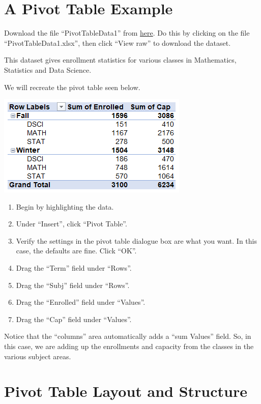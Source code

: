 \documentclass[
]{book}
\providecommand{\tightlist}{%
  \setlength{\itemsep}{0pt}\setlength{\parskip}{0pt}}
\begin{document}
\hypertarget{a-pivot-table-example}{%
\section{A Pivot Table Example}\label{a-pivot-table-example}}

Download the file ``PivotTableData1'' from \href{https://github.com/JoeH123/Data}{here}. Do this by clicking on the file ``PivotTableData1.xlsx'', then click ``View raw'' to download the dataset.

This dataset gives enrollment statistics for various classes in Mathematics, Statistics and Data Science.

We will recreate the pivot table seen below.

\includegraphics{PT1.png}

\begin{enumerate}
\def\labelenumi{\arabic{enumi}.}
\tightlist
\item
  Begin by highlighting the data.
\item
  Under ``Insert'', click ``Pivot Table''.
\item
  Verify the settings in the pivot table dialogue box are what you want. In this case, the defaults are fine. Click ``OK''.
\item
  Drag the ``Term'' field under ``Rows''.
\item
  Drag the ``Subj'' field under ``Rows''.
\item
  Drag the ``Enrolled'' field under ``Values''.
\item
  Drag the ``Cap'' field under ``Values''.
\end{enumerate}

Notice that the ``columns'' area automatically adds a ``sum Values'' field. So, in this case, we are adding up the enrollments and capacity from the classes in the various subject areas.

\hypertarget{pivot-table-layout-and-structure}{%
\section{Pivot Table Layout and Structure}\label{pivot-table-layout-and-structure}}
\end{document}
